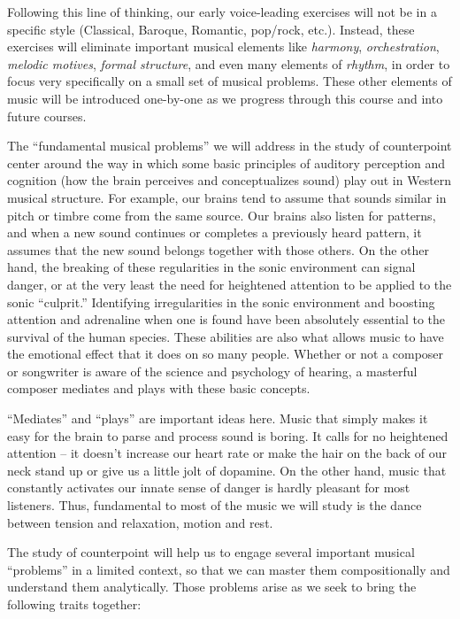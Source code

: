 \documentclass{book}
\begin{document}
Following this line of thinking, our early voice-leading exercises will not be
in a specific style (Classical, Baroque, Romantic, pop/rock, etc.). Instead,
these exercises will eliminate important musical elements like \emph{harmony},
\emph{orchestration}, \emph{melodic motives}, \emph{formal structure}, and
even many elements of \emph{rhythm}, in order to focus very specifically on a
small set of musical problems. These other elements of music will be
introduced one-by-one as we progress through this course and into future
courses.

The ``fundamental musical problems'' we will address in the study of
counterpoint center around the way in which some basic principles of auditory
perception and cognition (how the brain perceives and conceptualizes sound)
play out in Western musical structure. For example, our brains tend to assume
that sounds similar in pitch or timbre come from the same source. Our brains
also listen for patterns, and when a new sound continues or completes a
previously heard pattern, it assumes that the new sound belongs together with
those others. On the other hand, the breaking of these regularities in the
sonic environment can signal danger, or at the very least the need for
heightened attention to be applied to the sonic ``culprit.'' Identifying
irregularities in the sonic environment and boosting attention and adrenaline
when one is found have been absolutely essential to the survival of the human
species. These abilities are also what allows music to have the emotional
effect that it does on so many people. Whether or not a composer or songwriter
is aware of the science and psychology of hearing, a masterful composer
mediates and plays with these basic concepts.

``Mediates'' and ``plays'' are important ideas here. Music that simply makes
it easy for the brain to parse and process sound is boring. It calls for no
heightened attention -- it doesn't increase our heart rate or make the hair on
the back of our neck stand up or give us a little jolt of dopamine. On the
other hand, music that constantly activates our innate sense of danger is
hardly pleasant for most listeners. Thus, fundamental to most of the music we
will study is the dance between tension and relaxation, motion and rest.

The study of counterpoint will help us to engage several important musical
``problems'' in a limited context, so that we can master them compositionally
and understand them analytically. Those problems arise as we seek to bring the
following traits together:
\end{document}
